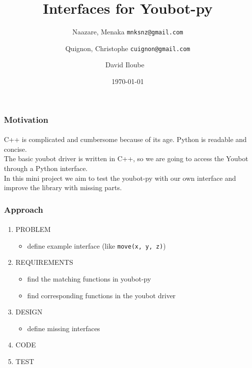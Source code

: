\documentclass{beamer}
\begin{document}
\title{Interfaces for Youbot-py}
\author{
  Naazare, Menaka \texttt{mnksnz@gmail.com}
  \\ \and
  Quignon, Christophe
  \texttt{cuignon@gmail.com}
  \\ \and
  David Iloube
  \texttt{%
  }
}
\date{\today}

\begin{frame}
\titlepage
\end{frame}

%

%

%
%
%
\begin{frame}
\frametitle{Motivation}
\framesubtitle{}
C++ is complicated and cumbersome because of its age. Python is readable and concise.\\
The basic youbot driver is written in C++, so we are going to access the Youbot through a Python interface.\\[\baselineskip]
In this mini project we aim to test the youbot-py with our own interface and improve the library with missing parts.  
\end{frame}


\begin{frame}
\frametitle{Approach}
\framesubtitle{}
  \begin{enumerate}   \item PROBLEM
   \begin{itemize}  \item define example interface (like \texttt{move(x, y, z)})   \end{itemize}
   \item REQUIREMENTS
   \begin{itemize}    
    \item find the matching functions in youbot-py 
    \item find corresponding functions in the youbot driver 
   \end{itemize}
   \item DESIGN \begin{itemize} \item define missing interfaces \end{itemize}
   \item CODE
   \item TEST
  \end{enumerate}

\end{frame}
\end{document}

